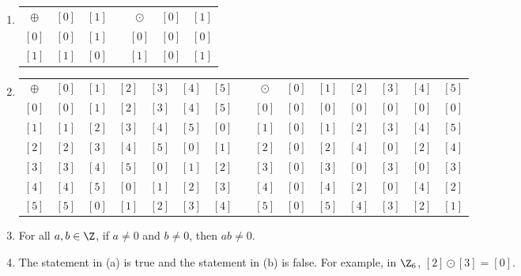 \begin{enumerate} 
\item 
\begin{tabular}{ c | c  c  p{0.5in} c | c  c }
$\oplus$ & $[ 0 ]$ & $[ 1 ]$  & & $\odot$ & $[ 0 ]$ & $[ 1 ]$   \\ \cline{1-3} \cline{5-7}

$[ 0 ]$ & $[ 0 ]$ & $[ 1 ]$  &  & $[ 0 ]$ & $[ 0 ]$ & $[ 0 ]$  \\ 
%
$[ 1 ]$ & $[ 1 ]$ & $[ 0 ]$  & & $[ 1 ]$ & $[ 0 ]$ & $[ 1 ]$   \\
%
\end{tabular}
\setcounter{enumi}{2}
\item 
\begin{tabular}{ c | c  c  c  c  c c p{0.1in} c | c  c  c  c  c c}
$\oplus$ & $[ 0 ]$ & $[ 1 ]$ & $[ 2 ]$ & $[ 3 ]$ & 
$[ 4 ]$ & $[ 5 ]$ & & $\odot$ & $[ 0 ]$ & $[ 1 ]$ & $[ 2 ]$ & $[ 3 ]$ & $[ 4 ]$ & $[ 5 ]$\\ \cline{1-7} \cline{9-15}

$[ 0 ]$ & $[ 0 ]$ & $[ 1 ]$ & $[ 2 ]$ & 
$[ 3 ]$ & $[ 4 ]$ & $[ 5 ]$ & & $[ 0 ]$ & $[ 0 ]$ & $[ 0 ]$ & $[ 0 ]$ & $[ 0 ]$ & $[ 0 ]$ & $[ 0 ]$ \\ 

$[ 1 ]$ & $[ 1 ]$ & $[ 2 ]$ & $[ 3 ]$ & 
$[ 4 ]$ & $[ 5 ]$ & $[ 0 ]$ & & $[ 1 ]$ & $[ 0 ]$ & $[ 1 ]$ & $[ 2 ]$ & $[ 3 ]$ & $[ 4 ]$ & $[ 5 ]$ \\ 

$[ 2 ]$ & $[ 2 ]$ & $[ 3 ]$ & $[ 4 ]$ & 
$[ 5 ]$ & $[ 0 ]$ & $[ 1 ]$ & & $[ 2 ]$ & $[ 0 ]$ & $[ 2 ]$ & $[ 4 ]$ & $[ 0 ]$ & $[ 2 ]$ & $[ 4 ]$ \\ 

$[ 3 ]$ & $[ 3 ]$ & $[ 4 ]$ & $[ 5 ]$ & 
$[ 0 ]$ & $[ 1 ]$ & $[ 2 ]$ & & $[ 3 ]$ & $[ 0 ]$ & $[ 3 ]$ & $[ 0 ]$ & $[ 3 ]$ & $[ 0 ]$ & $[ 3 ]$ \\ 

$[ 4 ]$ & $[ 4 ]$ & $[ 5 ]$ & $[ 0 ]$ & 
$[ 1 ]$ & $[ 2 ]$ & $[ 3 ]$ & & $[ 4 ]$ & $[ 0 ]$ & $[ 4 ]$ & $[ 2 ]$ & $[ 0 ]$ & $[ 4 ]$ & $[ 2 ]$ \\ 

$[ 5 ]$ & $[ 5 ]$ & $[ 0 ]$ & $[ 1 ]$ & 
$[ 2 ]$ & $[ 3 ]$ & $[ 4 ]$ & & $[ 5 ]$ & $[ 0 ]$ & $[ 5 ]$ & $[ 4 ]$ & $[ 3 ]$ & $[ 2 ]$ & $[ 1 ]$ \\ 
\end{tabular}

\item For all $a, b \in \Z$, if $a \ne 0$ and $b \ne 0$, then $ab \ne 0$.

\item The statement in (a) is true and the statement in (b) is false.  For example, in 
$\Z_6$, $[ 2 ] \odot [ 3 ] = [ 0 ]$.
\end{enumerate}


\hbreak


\endinput

